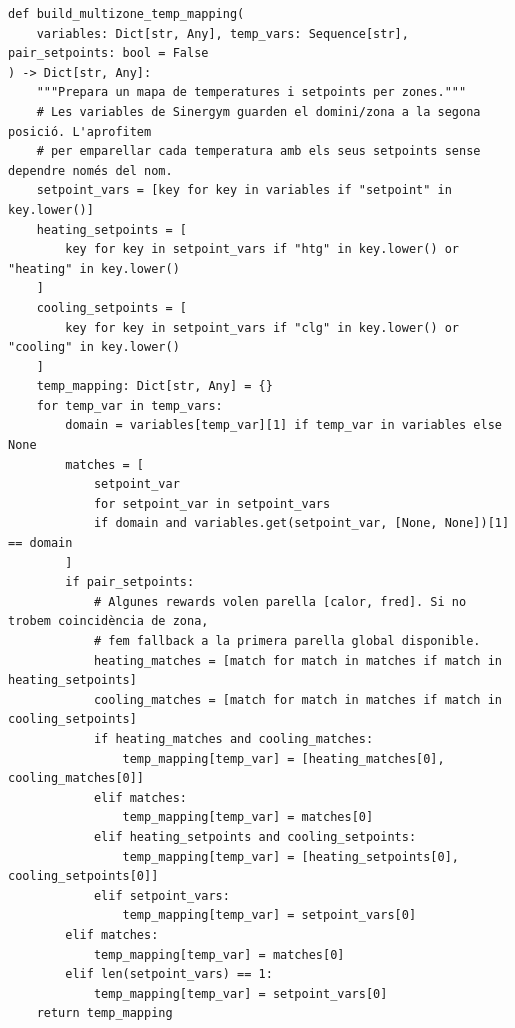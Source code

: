 \documentclass[10pt,a4paper]{article}
\begin{document}
\begin{lstlisting}[style=studioPython,caption={backend/entrenar\_agent\_rewards.py},label={lst:backend-entrenar-agent-rewards-py}]
def build_multizone_temp_mapping(
    variables: Dict[str, Any], temp_vars: Sequence[str], pair_setpoints: bool = False
) -> Dict[str, Any]:
    """Prepara un mapa de temperatures i setpoints per zones."""
    # Les variables de Sinergym guarden el domini/zona a la segona posició. L'aprofitem
    # per emparellar cada temperatura amb els seus setpoints sense dependre només del nom.
    setpoint_vars = [key for key in variables if "setpoint" in key.lower()]
    heating_setpoints = [
        key for key in setpoint_vars if "htg" in key.lower() or "heating" in key.lower()
    ]
    cooling_setpoints = [
        key for key in setpoint_vars if "clg" in key.lower() or "cooling" in key.lower()
    ]
    temp_mapping: Dict[str, Any] = {}
    for temp_var in temp_vars:
        domain = variables[temp_var][1] if temp_var in variables else None
        matches = [
            setpoint_var
            for setpoint_var in setpoint_vars
            if domain and variables.get(setpoint_var, [None, None])[1] == domain
        ]
        if pair_setpoints:
            # Algunes rewards volen parella [calor, fred]. Si no trobem coincidència de zona,
            # fem fallback a la primera parella global disponible.
            heating_matches = [match for match in matches if match in heating_setpoints]
            cooling_matches = [match for match in matches if match in cooling_setpoints]
            if heating_matches and cooling_matches:
                temp_mapping[temp_var] = [heating_matches[0], cooling_matches[0]]
            elif matches:
                temp_mapping[temp_var] = matches[0]
            elif heating_setpoints and cooling_setpoints:
                temp_mapping[temp_var] = [heating_setpoints[0], cooling_setpoints[0]]
            elif setpoint_vars:
                temp_mapping[temp_var] = setpoint_vars[0]
        elif matches:
            temp_mapping[temp_var] = matches[0]
        elif len(setpoint_vars) == 1:
            temp_mapping[temp_var] = setpoint_vars[0]
    return temp_mapping



\end{lstlisting}
\end{document}
